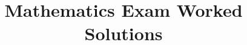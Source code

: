 \documentclass[a4paper,12pt]{article}
\begin{document}
 
\pagestyle{fancy}
\fancyhf{}                               
\renewcommand\headrulewidth{0pt} 
\title{\textbf{Mathematics Exam Worked Solutions}} %
\date{} %
\maketitle %

\end{document}
